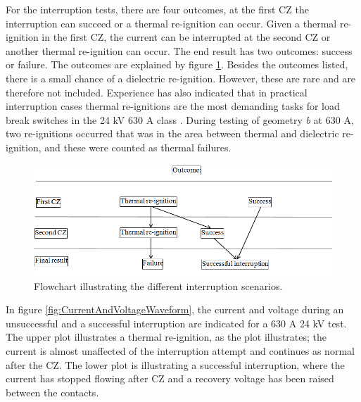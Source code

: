 \documentclass[10pt,a4paper,twoside]{article}
\begin{document}
For the interruption tests, there are four outcomes, at the first CZ the interruption can succeed or a thermal re-ignition can occur. Given a thermal re-ignition in the first CZ, the current can be interrupted at the second CZ or another thermal re-ignition can occur. The end result has two outcomes: success or failure. The outcomes are explained by figure \ref{fig:pilSuccessOfFail}. Besides the outcomes listed, there is a small chance of a dielectric re-ignition. However, these are rare and are therefore not included. Experience has also indicated that in practical interruption cases thermal re-ignitions are the most demanding tasks for load break switches in the 24 kV 630 A class \cite{bib:AFIMVLBA}. During testing of geometry \textit{b} at 630 A, two re-ignitions occurred that was in the area between thermal and dielectric re-ignition, and these were counted as thermal failures.

\begin{figure}[H]
\centering
\includegraphics[scale=0.6]{Bilder/Results/interruptionFlowChart.png}
\caption{Flowchart illustrating the different interruption scenarios.} \label{fig:pilSuccessOfFail}
\end{figure}

In figure \ref{fig:CurrentAndVoltageWaveform}, the current and voltage during an unsuccessful and a successful interruption are indicated for a 630 A 24 kV test. The upper plot illustrates a thermal re-ignition, as the plot illustrates; the current is almost unaffected of the interruption attempt and continues as normal after the CZ. The lower plot is illustrating a successful interruption, where the current has stopped flowing after CZ and a recovery voltage has been raised between the contacts.
\end{document}
